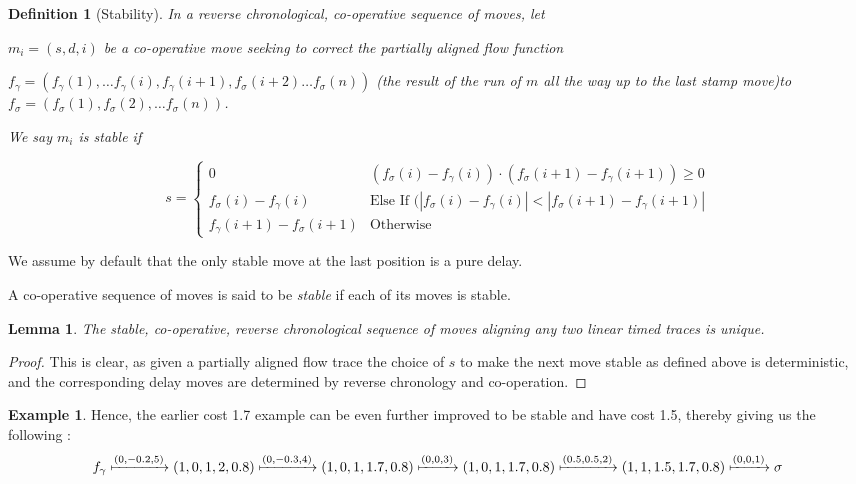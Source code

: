 \documentclass{article}
\newcounter{cases}
\newtheorem{lemma}[theorem]{Lemma}
\theoremstyle{Definition}
\newtheorem{definition}{Definition}
\theoremstyle{definition}
\newtheorem{example}{Example}
\begin{document}
	\begin{definition}[Stability]
	In a reverse chronological, co-operative sequence of moves, let  
	
	$m_i = (s, d, i)$ be a co-operative move seeking to correct the partially aligned flow function 
	
	$f_\gamma = (f_\gamma(1), \dots f_\gamma(i), f_\gamma(i+1), f_\sigma(i+2) \dots f_\sigma(n))$ (the result of the run of $m$ all the way up to the last stamp move)to $f_\sigma = (f_\sigma(1), f_\sigma(2), \dots f_\sigma(n))$. 
	
	We say $m_i$ is \textit{stable} if 
		
		$$s = \begin{cases}
			0 & (f_\sigma(i) - f_\gamma(i))\cdot (f_\sigma(i+1) - f_\gamma(i+1)) \geq 0 \\
			f_\sigma(i) - f_\gamma(i) & \textrm{Else If }(|f_\sigma(i) - f_\gamma(i)| < |f_\sigma(i+1) - f_\gamma(i+1)| \\
			f_\gamma(i+1) - f_\sigma(i+1) & \textrm{Otherwise}
		\end{cases}$$
	\end{definition}
	
	We assume by default that the only stable move at the last position is a pure delay. 
	
	A co-operative sequence of moves is said to be \textit{stable} if each of its moves is stable.
	
	\begin{lemma}\label{stableunique} The stable, co-operative, reverse chronological sequence of moves aligning any two linear timed traces is unique. 
	\end{lemma}

\begin{proof}
	This is clear, as given a partially aligned flow trace the choice of $s$ to make the next move stable as defined above is deterministic, and the corresponding delay moves are determined by reverse chronology and co-operation. 
\end{proof}
	
	\begin{example}
		Hence, the earlier cost 1.7 example can be even further improved to be stable and have cost 1.5, thereby giving us the following :
		$$f_\gamma \xmapsto{(0, -0.2, 5)} (1, 0, 1, 2, 0.8) \xmapsto{(0, -0.3, 4)} (1, 0, 1, 1.7, 0.8) \xmapsto{(0, 0, 3)} (1, 0, 1, 1.7, 0.8) \xmapsto{(0.5, 0.5, 2)} (1, 1, 1.5, 1.7, 0.8) \xmapsto{(0, 0, 1)} \sigma $$

	\end{example}
	
\end{document}
